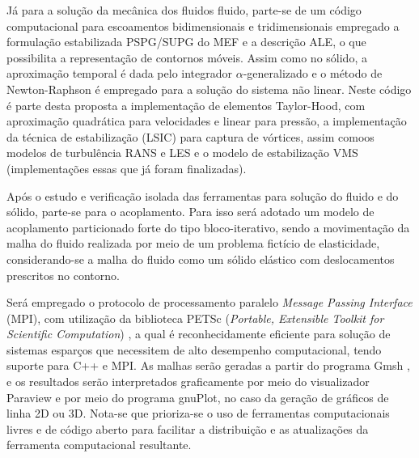 Já para a solução da mecânica dos fluidos fluido, parte-se de um código computacional para escoamentos bidimensionais e tridimensionais empregado a formulação estabilizada PSPG/SUPG do MEF e a descrição ALE, o que possibilita a representação de contornos móveis. Assim como no sólido, a aproximação temporal é dada pelo integrador $\alpha$-generalizado e o método de Newton-Raphson é empregado para a solução do sistema não linear. Neste código é parte desta proposta a implementação de elementos Taylor-Hood, com aproximação quadrática para velocidades e linear para pressão, a implementação da técnica de estabilização \LSIC (LSIC) para captura de vórtices, assim comoos modelos de turbulência RANS e LES e o modelo de estabilização VMS (implementações essas que já foram finalizadas).

Após o estudo e verificação isolada das ferramentas para solução do fluido e do sólido, parte-se para o acoplamento.
Para isso será adotado um modelo de acoplamento particionado forte do tipo bloco-iterativo, sendo a movimentação da malha do fluido realizada por meio de um problema fictício de elasticidade, considerando-se a malha do fluido como um sólido elástico com deslocamentos prescritos no contorno.




Será empregado o protocolo de processamento paralelo \textit{Message Passing Interface} (MPI), com utilização da biblioteca PETSc (\textit{Portable, Extensible Toolkit for Scientific Computation}) \cite{petsc-web-page}, a qual é reconhecidamente eficiente para solução de sistemas esparços que necessitem de alto desempenho computacional, tendo suporte para C++ e MPI.  As malhas serão geradas a partir do programa Gmsh \cite{geuzaine2009gmsh}, e os resultados serão interpretados graficamente por meio do visualizador Paraview \cite{ahrens2005paraview} e por meio do programa gnuPlot, no caso da geração de gráficos de linha 2D ou 3D. Nota-se que prioriza-se o uso de ferramentas computacionais livres e de código aberto para facilitar a distribuição e as atualizações da ferramenta computacional resultante.

